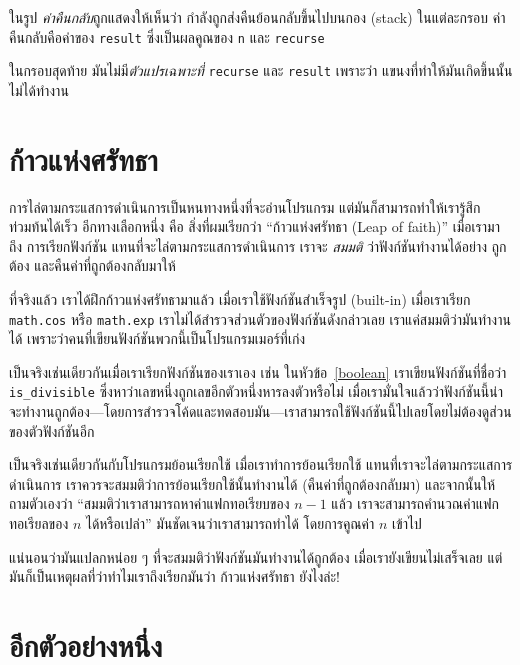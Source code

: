ในรูป
\textit{ค่าคืนกลับ}ถูกแสดงให้เห็นว่า
กำลังถูกส่งคืนย้อนกลับขึ้นไปบนกอง (stack) ในแต่ละกรอบ 
ค่าคืนกลับคือค่าของ {\tt result} ซึ่งเป็นผลคูณของ {\tt n} และ {\tt recurse}

ในกรอบสุดท้าย มันไม่มี\textit{ตัวแปรเฉพาะที่} {\tt recurse} และ {\tt result} เพราะว่า
แขนงที่ทำให้มันเกิดขึ้นนั้นไม่ได้ทำงาน


\section{ก้าวแห่งศรัทธา} %

การไล่ตามกระแสการดำเนินการเป็นหนทางหนึ่งที่จะอ่านโปรแกรม แต่มันก็สามารถทำให้เรารู้สึกท่วมท้นได้เร็ว
อีกทางเลือกหนึ่ง คือ สิ่งที่ผมเรียกว่า ``ก้าวแห่งศรัทธา (Leap of faith)'' เมื่อเรามาถึง
การเรียกฟังก์ชัน แทนที่จะไล่ตามกระแสการดำเนินการ เราจะ {\em สมมติ} ว่าฟังก์ชันทำงานได้อย่าง
ถูกต้อง และคืนค่าที่ถูกต้องกลับมาให้

ที่จริงแล้ว เราได้ฝึกก้าวแห่งศรัทธามาแล้ว เมื่อเราใช้ฟังก์ชันสำเร็จรูป (built-in)
เมื่อเราเรียก {\tt math.cos} หรือ {\tt math.exp} เราไม่ได้สำรวจส่วนตัวของฟังก์ชันดังกล่าวเลย
เราแค่สมมติว่ามันทำงานได้ เพราะว่าคนที่เขียนฟังก์ชันพวกนี้เป็นโปรแกรมเมอร์ที่เก่ง

เป็นจริงเช่นเดียวกันเมื่อเราเรียกฟังก์ชันของเราเอง เช่น ในหัวข้อ~\ref{boolean} เราเขียนฟังก์ชันที่ชื่อว่า
\verb"is_divisible" ซึ่งหาว่าเลขหนึ่งถูกเลขอีกตัวหนึ่งหารลงตัวหรือไม่ 
เมื่อเรามั่นใจแล้วว่าฟังก์ชันนี้น่าจะทำงานถูกต้อง---โดยการสำรวจโค้ดและทดสอบมัน---เราสามารถใช้ฟังก์ชันนี้ไปเลยโดยไม่ต้องดูส่วนของตัวฟังก์ชันอีก

เป็นจริงเช่นเดียวกันกับโปรแกรมย้อนเรียกใช้ เมื่อเราทำการย้อนเรียกใช้ แทนที่เราจะไล่ตามกระแสการดำเนินการ
เราควรจะสมมติว่าการย้อนเรียกใช้นั้นทำงานได้ (คืนค่าที่ถูกต้องกลับมา) และจากนั้นให้ถามตัวเองว่า
``สมมติว่าเราสามารถหาค่าแฟกทอเรียบของ {\scriptsize$n-1$} แล้ว เราจะสามารถคำนวณค่าแฟกทอเรียลของ {\scriptsize$n$}
ได้หรือเปล่า'' มันชัดเจนว่าเราสามารถทำได้ โดยการคูณค่า {\scriptsize$n$} เข้าไป

แน่นอนว่ามันแปลกหน่อย ๆ ที่จะสมมติว่าฟังก์ชันมันทำงานได้ถูกต้อง เมื่อเรายังเขียนไม่เสร็จเลย
แต่มันก็เป็นเหตุผลที่ว่าทำไมเราถึงเรียกมันว่า ก้าวแห่งศรัทธา ยังไงล่ะ!


\section{อีกตัวอย่างหนึ่ง} %
\label{one.more.example}

